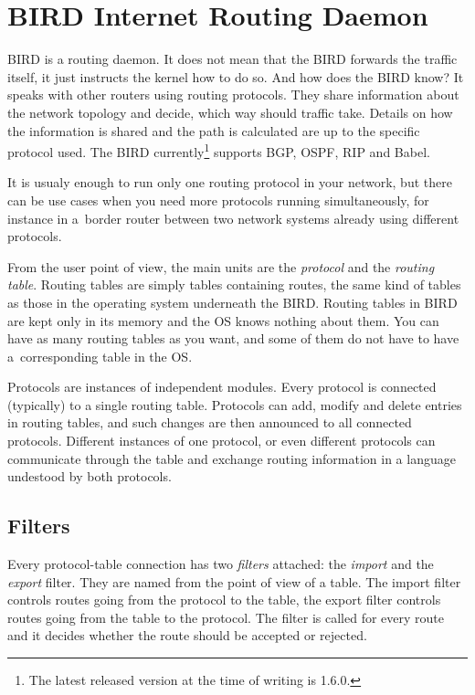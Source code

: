 \chapter{BIRD Internet Routing Daemon}

BIRD is a routing daemon. It does not mean that the BIRD forwards the traffic
itself, it just instructs the kernel how to do so. And how does the BIRD know?
It speaks with other routers using routing protocols. They share information
about the network topology and decide, which way should traffic take. Details
on how the information is shared and the path is calculated are up to the
specific protocol used. The BIRD currently\footnote{The latest released version
at the time of writing is 1.6.0.} supports BGP, OSPF, RIP and Babel.

It is usualy enough to run only one routing protocol in your network, but there
can be use cases when you need more protocols running simultaneously, for instance in a~border
router between two network systems already using different protocols.

From the user point of view, the main units are the \emph{protocol} and the
\emph{routing table}. Routing tables are simply tables containing routes, the
same kind of tables as those in the operating system underneath the BIRD.
Routing tables in BIRD are kept only in its memory and the OS knows nothing
about them. You can have as many routing tables as you want, and some of them do
not have to have a~corresponding table in the OS.

Protocols are instances of independent modules. Every protocol is connected
(typically) to a single routing table. Protocols can add, modify and delete entries
in routing tables, and such changes are then announced to all connected
protocols. Different instances of one protocol, or even different protocols can
communicate through the table and exchange routing information in a language
undestood by both protocols.

\section{Filters}
Every protocol-table connection has two \emph{filters} attached: the
\emph{import} and the \emph{export} filter. They are named from the point of
view of a table. The import filter controls routes going from the protocol to
the table, the export filter controls routes going from the table to the
protocol. The filter is called for every route and it decides whether the route
should be accepted or rejected.

